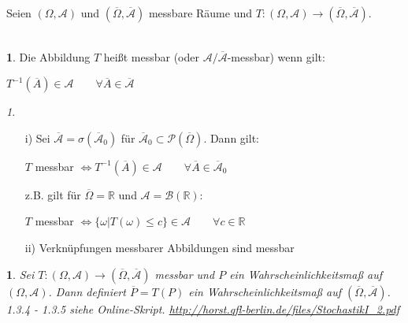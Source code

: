 \documentclass[10pt,a4paper]{report}
\numberwithin{equation}{section}
\numberwithin{figure}{section}
\theoremstyle{plain}
\theoremstyle{definition}
\newtheorem{defn}[thm]{\protect\definitionname}
\theoremstyle{remark}
\newtheorem{rem}[thm]{\protect\remarkname}
\theoremstyle{plain}
\newtheorem{prop}[thm]{\protect\propositionname}
\providecommand{\definitionname}{Definition}
\providecommand{\propositionname}{Satz}
\providecommand{\remarkname}{Bemerkung}
\newcommand{\1}{ \mathbb{1} } %
\begin{document}
Seien $(\Omega, \mathcal{A})$ und $(\overline{\Omega},\overline{\mathcal{A}})$ messbare Räume und $T: (\Omega, \mathcal{A}) \to (\overline{\Omega},\overline{\mathcal{A}})$.\\\\
\begin{defn}
  Die Abbildung $T$ heißt messbar  (oder
  $\mathcal{A}/\overline{\mathcal{A}}$-messbar) wenn gilt:
  \begin{center}
    $T^{-1}(\overline{A}) \in \mathcal{A} \qquad \forall \overline{A}
    \in \overline{\mathcal{A}}$
  \end{center}
\end{defn}
\begin{rem} \
  \begin{itemize}
  \item[i)] Sei
    $\overline{\mathcal{A}}=\sigma(\overline{\mathcal{A}}_0)$ für
    $\overline{\mathcal{A}}_0 \subset
    \mathcal{P}(\overline{\Omega})$. Dann gilt:
    \begin{center}
      $T$ messbar $\Leftrightarrow T^{-1}(\overline{A}) \in
      \mathcal{A} \qquad \forall \overline{A} \in
      \overline{\mathcal{A}}_0$
    \end{center}
    z.B. gilt für $\overline{\Omega}=\mathbb{R}$ und
    $\mathcal{A}=\mathcal{B}(\mathbb{R})$:
    \begin{center}
      $T$ messbar $\Leftrightarrow \{\omega|T(\omega)\leq c\} \in
      \mathcal{A} \qquad \forall c \in \mathbb{R}$
    \end{center}
  \item[ii)] Verknüpfungen messbarer Abbildungen sind messbar
  \end{itemize}
\end{rem}
\begin{prop}
  Sei $T:(\Omega, \mathcal{A})\to(\overline{\Omega},\overline{\mathcal{A}})$ messbar und $P$ ein Wahrscheinlichkeitsmaß auf $(\Omega, \mathcal{A})$. Dann definiert $\overline{P}=T(P)$ ein Wahrscheinlichkeitsmaß auf $(\overline{\Omega},\overline{\mathcal{A}})$.\\
  1.3.4 - 1.3.5 siehe Online-Skript. \url{http://horst.qfl-berlin.de/files/StochastikI_2.pdf}
\end{prop}
\end{document}
